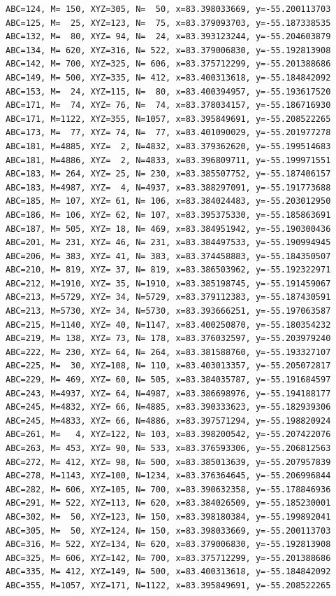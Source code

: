 \documentclass{article}
\begin{document}
\begin{enumerate}
\begin{verbatim}
ABC=124, M= 150, XYZ=305, N=  50, x=83.398033669, y=-55.200113703
ABC=125, M=  25, XYZ=123, N=  75, x=83.379093703, y=-55.187338535
ABC=132, M=  80, XYZ= 94, N=  24, x=83.393123244, y=-55.204603879
ABC=134, M= 620, XYZ=316, N= 522, x=83.379006830, y=-55.192813908
ABC=142, M= 700, XYZ=325, N= 606, x=83.375712299, y=-55.201388686
ABC=149, M= 500, XYZ=335, N= 412, x=83.400313618, y=-55.184842092
ABC=153, M=  24, XYZ=115, N=  80, x=83.400394957, y=-55.193617520
ABC=171, M=  74, XYZ= 76, N=  74, x=83.378034157, y=-55.186716930
ABC=171, M=1122, XYZ=355, N=1057, x=83.395849691, y=-55.208522265
ABC=173, M=  77, XYZ= 74, N=  77, x=83.401090029, y=-55.201977278
ABC=181, M=4885, XYZ=  2, N=4832, x=83.379362620, y=-55.199514683
ABC=181, M=4886, XYZ=  2, N=4833, x=83.396809711, y=-55.199971551
ABC=183, M= 264, XYZ= 25, N= 230, x=83.385507752, y=-55.187406157
ABC=183, M=4987, XYZ=  4, N=4937, x=83.388297091, y=-55.191773688
ABC=185, M= 107, XYZ= 61, N= 106, x=83.384024483, y=-55.203012950
ABC=186, M= 106, XYZ= 62, N= 107, x=83.395375330, y=-55.185863691
ABC=187, M= 505, XYZ= 18, N= 469, x=83.384951942, y=-55.190300436
ABC=201, M= 231, XYZ= 46, N= 231, x=83.384497533, y=-55.190994945
ABC=206, M= 383, XYZ= 41, N= 383, x=83.374458883, y=-55.184350507
ABC=210, M= 819, XYZ= 37, N= 819, x=83.386503962, y=-55.192322971
ABC=212, M=1910, XYZ= 35, N=1910, x=83.385198745, y=-55.191459067
ABC=213, M=5729, XYZ= 34, N=5729, x=83.379112383, y=-55.187430591
ABC=213, M=5730, XYZ= 34, N=5730, x=83.393666251, y=-55.197063587
ABC=215, M=1140, XYZ= 40, N=1147, x=83.400250870, y=-55.180354232
ABC=219, M= 138, XYZ= 73, N= 178, x=83.376032597, y=-55.203979240
ABC=222, M= 230, XYZ= 64, N= 264, x=83.381588760, y=-55.193327107
ABC=225, M=  30, XYZ=108, N= 110, x=83.403013357, y=-55.205072817
ABC=229, M= 469, XYZ= 60, N= 505, x=83.384035787, y=-55.191684597
ABC=243, M=4937, XYZ= 64, N=4987, x=83.386698976, y=-55.194188177
ABC=245, M=4832, XYZ= 66, N=4885, x=83.390333623, y=-55.182939306
ABC=245, M=4833, XYZ= 66, N=4886, x=83.397571294, y=-55.198820924
ABC=261, M=   4, XYZ=122, N= 103, x=83.398200542, y=-55.207422076
ABC=263, M= 453, XYZ= 90, N= 533, x=83.376593306, y=-55.206812563
ABC=272, M= 412, XYZ= 98, N= 500, x=83.385013639, y=-55.207957839
ABC=278, M=1143, XYZ=100, N=1234, x=83.376364645, y=-55.206996844
ABC=282, M= 606, XYZ=105, N= 700, x=83.390632358, y=-55.178846936
ABC=291, M= 522, XYZ=113, N= 620, x=83.384026509, y=-55.185230001
ABC=302, M=  50, XYZ=123, N= 150, x=83.398180384, y=-55.199892041
ABC=305, M=  50, XYZ=124, N= 150, x=83.398033669, y=-55.200113703
ABC=316, M= 522, XYZ=134, N= 620, x=83.379006830, y=-55.192813908
ABC=325, M= 606, XYZ=142, N= 700, x=83.375712299, y=-55.201388686
ABC=335, M= 412, XYZ=149, N= 500, x=83.400313618, y=-55.184842092
ABC=355, M=1057, XYZ=171, N=1122, x=83.395849691, y=-55.208522265
\end{verbatim}


\end{enumerate}
\end{document}
